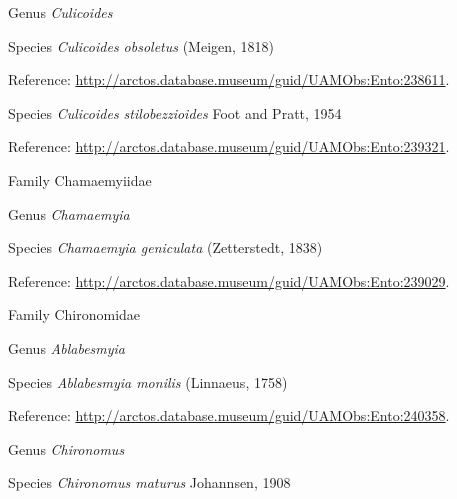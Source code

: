 \documentclass[9pt, article]{memoir}
\begin{document}
\begin{multicols}{2}
\vspace{6pt}\noindent\hspace{30pt}Genus \textit{Culicoides}


\vspace{6pt}\noindent\hspace{36pt}Species \textit{Culicoides obsoletus} (Meigen, 1818)


Reference: 
\url{http://arctos.database.museum/guid/UAMObs:Ento:238611}.

\vspace{6pt}\noindent\hspace{36pt}Species \textit{Culicoides stilobezzioides} Foot and Pratt, 1954


Reference: 
\url{http://arctos.database.museum/guid/UAMObs:Ento:239321}.

\vspace{6pt}\noindent\hspace{24pt}Family Chamaemyiidae


\vspace{6pt}\noindent\hspace{30pt}Genus \textit{Chamaemyia}


\vspace{6pt}\noindent\hspace{36pt}Species \textit{Chamaemyia geniculata} (Zetterstedt, 1838)


Reference: 
\url{http://arctos.database.museum/guid/UAMObs:Ento:239029}.

\vspace{6pt}\noindent\hspace{24pt}Family Chironomidae


\vspace{6pt}\noindent\hspace{30pt}Genus \textit{Ablabesmyia}


\vspace{6pt}\noindent\hspace{36pt}Species \textit{Ablabesmyia monilis} (Linnaeus, 1758)


Reference: 
\url{http://arctos.database.museum/guid/UAMObs:Ento:240358}.

\vspace{6pt}\noindent\hspace{30pt}Genus \textit{Chironomus}


\vspace{6pt}\noindent\hspace{36pt}Species \textit{Chironomus maturus} Johannsen, 1908



\end{multicols}
\end{document}
